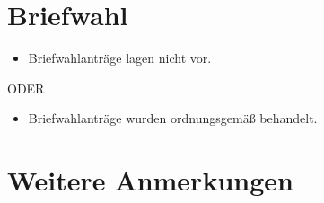 \documentclass[a4paper]{scrartcl}
\begin{document}





\section{Briefwahl}
\begin{itemize}[label=$\Box$]
\item Briefwahlanträge lagen nicht vor.
\end{itemize}

 ODER
 
\begin{itemize}[label=$\Box$]
\item Briefwahlanträge wurden ordnungsgemäß behandelt.
\end{itemize}



\section{Weitere Anmerkungen}




\end{document}
